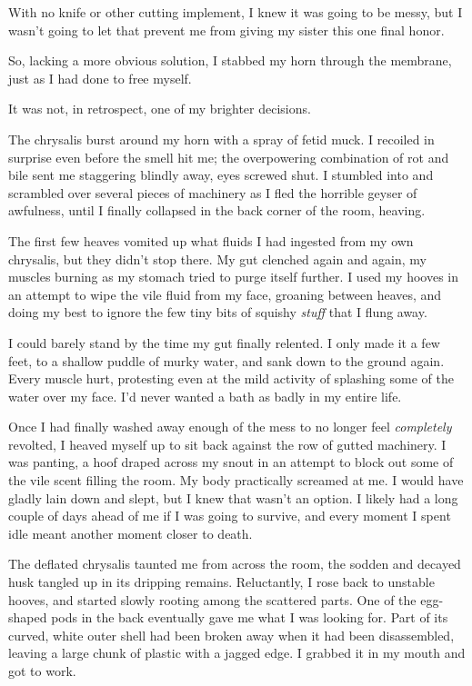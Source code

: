 With no knife or other cutting implement, I knew it was going to be messy, but I wasn’t going to let that prevent me from giving my sister this one final honor.

So, lacking a more obvious solution, I stabbed my horn through the membrane, just as I had done to free myself.

It was not, in retrospect, one of my brighter decisions.

The chrysalis burst around my horn with a spray of fetid muck. I recoiled in surprise even before the smell hit me; the overpowering combination of rot and bile sent me staggering blindly away, eyes screwed shut. I stumbled into and scrambled over several pieces of machinery as I fled the horrible geyser of awfulness, until I finally collapsed in the back corner of the room, heaving.

The first few heaves vomited up what fluids I had ingested from my own chrysalis, but they didn’t stop there. My gut clenched again and again, my muscles burning as my stomach tried to purge itself further. I used my hooves in an attempt to wipe the vile fluid from my face, groaning between heaves, and doing my best to ignore the few tiny bits of squishy \textit{stuff} that I flung away.

I could barely stand by the time my gut finally relented. I only made it a few feet, to a shallow puddle of murky water, and sank down to the ground again. Every muscle hurt, protesting even at the mild activity of splashing some of the water over my face. I’d never wanted a bath as badly in my entire life.

Once I had finally washed away enough of the mess to no longer feel \textit{completely} revolted, I heaved myself up to sit back against the row of gutted machinery. I was panting, a hoof draped across my snout in an attempt to block out some of the vile scent filling the room. My body practically screamed at me. I would have gladly lain down and slept, but I knew that wasn’t an option. I likely had a long couple of days ahead of me if I was going to survive, and every moment I spent idle meant another moment closer to death.

The deflated chrysalis taunted me from across the room, the sodden and decayed husk tangled up in its dripping remains. Reluctantly, I rose back to unstable hooves, and started slowly rooting among the scattered parts. One of the egg-shaped pods in the back eventually gave me what I was looking for. Part of its curved, white outer shell had been broken away when it had been disassembled, leaving a large chunk of plastic with a jagged edge. I grabbed it in my mouth and got to work.

